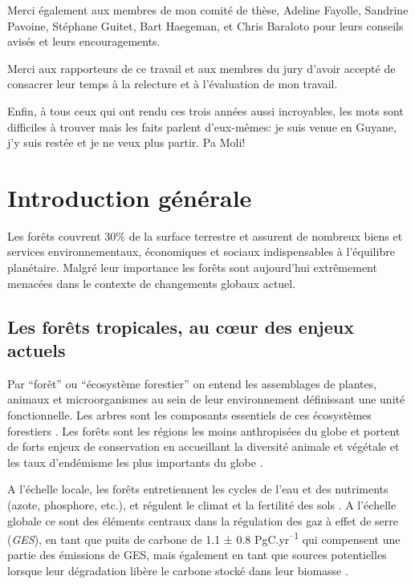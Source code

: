 \documentclass[
  11pt,
  french,
  A4paper,
  extrafontsizes,onecolumn,openright
  ]{memoir}
\begin{document}
Merci également aux membres de mon comité de thèse, Adeline Fayolle,
Sandrine Pavoine, Stéphane Guitet, Bart Haegeman, et Chris Baraloto pour
leurs conseils avisés et leurs encouragements.

Merci aux rapporteurs de ce travail et aux membres du jury d'avoir
accepté de consacrer leur temps à la relecture et à l'évaluation de mon
travail.

Enfin, à tous ceux qui ont rendu ces trois années aussi incroyables, les
mots sont difficiles à trouver mais les faits parlent d'eux-mêmes: je
suis venue en Guyane, j'y suis restée et je ne veux plus partir. Pa
Moli!

\chapter{Introduction générale}\label{introduction-generale}

Les forêts couvrent 30\% de la surface terrestre et assurent de nombreux
biens et services environnementaux, économiques et sociaux
indispensables à l'équilibre planétaire. Malgré leur importance les
forêts sont aujourd'hui extrêmement menacées dans le contexte de
changements globaux actuel.

\section{Les forêts tropicales, au cœur des enjeux
actuels}\label{les-forets-tropicales-au-cur-des-enjeux-actuels}

Par ``forêt'' ou ``écosystème forestier'' on entend les assemblages de
plantes, animaux et microorganismes au sein de leur environnement
définissant une unité fonctionnelle. Les arbres sont les composants
essentiels de ces écosystèmes forestiers \autocite{FRA2000}. Les forêts
sont les régions les moins anthropisées du globe et portent de forts
enjeux de conservation en accueillant la diversité animale et végétale
et les taux d'endémisme les plus importants du globe
\autocites{Myers2000}{Mittermeier2003}.

A l'échelle locale, les forêts entretiennent les cycles de l'eau et des
nutriments (azote, phosphore, etc.), et régulent le climat et la
fertilité des sols \autocites{Malhi2008}{Isbell2017}. A l'échelle
globale ce sont des éléments centraux dans la régulation des gaz à effet
de serre (\emph{GES}), en tant que puits de carbone de 1.1 ± 0.8
PgC.yr\textsuperscript{--1} qui compensent une partie des émissions de
GES, mais également en tant que sources potentielles lorsque leur
dégradation libère le carbone stocké dans leur biomasse
\autocites{Pan2011}{Roy2017}.
\end{document}
